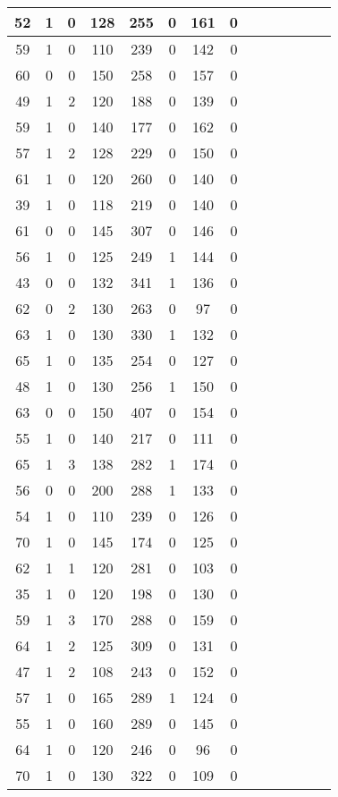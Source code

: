 \documentclass{article}
\begin{document}
\begin{center}
\begin{longtable}{|c|c|c|c|c|c|c|c|c|c|c|c|c|c|}
\hline
52 & 1 & 0 & 128 & 255 & 0 & 161 & 0 \\
\hline
59 & 1 & 0 & 110 & 239 & 0 & 142 & 0 \\
\hline
60 & 0 & 0 & 150 & 258 & 0 & 157 & 0 \\
\hline
49 & 1 & 2 & 120 & 188 & 0 & 139 & 0 \\
\hline
59 & 1 & 0 & 140 & 177 & 0 & 162 & 0 \\
\hline
57 & 1 & 2 & 128 & 229 & 0 & 150 & 0 \\
\hline
61 & 1 & 0 & 120 & 260 & 0 & 140 & 0 \\
\hline
39 & 1 & 0 & 118 & 219 & 0 & 140 & 0 \\
\hline
61 & 0 & 0 & 145 & 307 & 0 & 146 & 0 \\
\hline
56 & 1 & 0 & 125 & 249 & 1 & 144 & 0 \\
\hline
43 & 0 & 0 & 132 & 341 & 1 & 136 & 0 \\
\hline
62 & 0 & 2 & 130 & 263 & 0 & 97 & 0 \\
\hline
63 & 1 & 0 & 130 & 330 & 1 & 132 & 0 \\
\hline
65 & 1 & 0 & 135 & 254 & 0 & 127 & 0 \\
\hline
48 & 1 & 0 & 130 & 256 & 1 & 150 & 0 \\
\hline
63 & 0 & 0 & 150 & 407 & 0 & 154 & 0 \\
\hline
55 & 1 & 0 & 140 & 217 & 0 & 111 & 0 \\
\hline
65 & 1 & 3 & 138 & 282 & 1 & 174 & 0 \\
\hline
56 & 0 & 0 & 200 & 288 & 1 & 133 & 0 \\
\hline
54 & 1 & 0 & 110 & 239 & 0 & 126 & 0 \\
\hline
70 & 1 & 0 & 145 & 174 & 0 & 125 & 0 \\
\hline
62 & 1 & 1 & 120 & 281 & 0 & 103 & 0 \\
\hline
35 & 1 & 0 & 120 & 198 & 0 & 130 & 0 \\
\hline
59 & 1 & 3 & 170 & 288 & 0 & 159 & 0 \\
\hline
64 & 1 & 2 & 125 & 309 & 0 & 131 & 0 \\
\hline
47 & 1 & 2 & 108 & 243 & 0 & 152 & 0 \\
\hline
57 & 1 & 0 & 165 & 289 & 1 & 124 & 0 \\
\hline
55 & 1 & 0 & 160 & 289 & 0 & 145 & 0 \\
\hline
64 & 1 & 0 & 120 & 246 & 0 & 96 & 0 \\
\hline
70 & 1 & 0 & 130 & 322 & 0 & 109 & 0 \\

\end{longtable}
\end{center}
\end{document}
